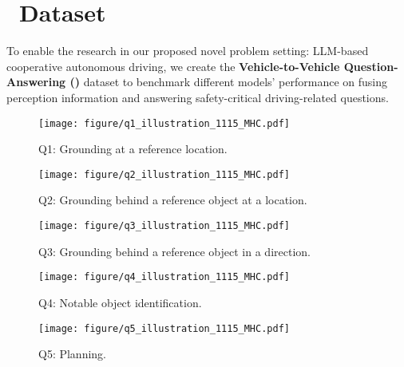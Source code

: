 \section{\namedataset~Dataset}
To enable the research in our proposed novel problem setting: LLM-based cooperative autonomous driving, we create the \textbf{Vehicle-to-Vehicle Question-Answering (\namedataset)} dataset to benchmark different models' performance on fusing perception information and answering safety-critical driving-related questions.

\begin{figure*}[!t]
        \centering
        \begin{subfigure}[t]{0.32\textwidth}
            \centering 
            \texttt{[image: figure/q1\_illustration\_1115\_MHC.pdf]}
            \caption[]%
            {{Q1: Grounding at a reference location.}}    
            \label{fig:q1_illustration}
        \end{subfigure}
        \hfill
        \begin{subfigure}[t]{0.32\textwidth}  
            \centering 
            \texttt{[image: figure/q2\_illustration\_1115\_MHC.pdf]}
            \caption[]%
            {{Q2: Grounding behind a reference object at a location.}}    
            \label{fig:q2_illustration}
        \end{subfigure}
        \hfill
        \begin{subfigure}[t]{0.32\textwidth}
            \centering 
            \texttt{[image: figure/q3\_illustration\_1115\_MHC.pdf]}
            \caption[]%
            {{Q3: Grounding behind a reference object in a direction.}}    
            \label{fig:q3_illustration}
        \end{subfigure}

        \begin{subfigure}[t]{0.32\textwidth}
            \centering 
            \texttt{[image: figure/q4\_illustration\_1115\_MHC.pdf]}
            \caption[]%
            {{Q4: Notable object identification.}}    
            \label{fig:q4_illustration}
        \end{subfigure}
        \hspace*{0.0175\textwidth}%
        \begin{subfigure}[t]{0.32\textwidth}
            \centering 
            \texttt{[image: figure/q5\_illustration\_1115\_MHC.pdf]}
            \caption[]%
            {{Q5: Planning.}}    
            \label{fig:q5_illustration}
        \end{subfigure}
        \hfill
        

\end{figure*}
